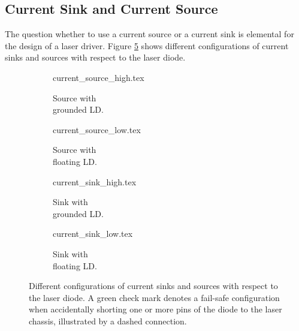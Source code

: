 \subsection{Current Sink and Current Source}%
\label{sec:current_sink_current_source}
The question whether to use a current source or a current sink is elemental for the design of a laser driver. Figure \ref{fig:current_sink_source} shows different configurations of current sinks and sources with respect to the laser diode.
\begin{figure}[ht]
    \centering
    \begin{subfigure}{0.225\linewidth}
        \centering
        {current_source_high.tex}
        \caption{Source with\protect\\grounded LD.}
        \label{fig:current_source_high}
    \end{subfigure}
    \begin{subfigure}{0.225\linewidth}
        \centering
        {current_source_low.tex}
        \caption{Source with\protect\\floating LD.}
        \label{fig:current_source_low}
    \end{subfigure}
    \begin{subfigure}{0.225\linewidth}
        \centering
        {current_sink_high.tex}
        \caption{Sink with\protect\\grounded LD.}
        \label{fig:current_sink_high}
    \end{subfigure}
    \begin{subfigure}{0.225\linewidth}
        \centering
        {current_sink_low.tex}
        \caption{Sink with\protect\\floating LD.}
        \label{fig:current_sink_low}
    \end{subfigure}
    \caption{Different configurations of current sinks and sources with respect to the laser diode. A green check mark denotes a fail-safe configuration when accidentally shorting one or more pins of the diode to the laser chassis, illustrated by a dashed connection.}
    \label{fig:current_sink_source}
\end{figure}

